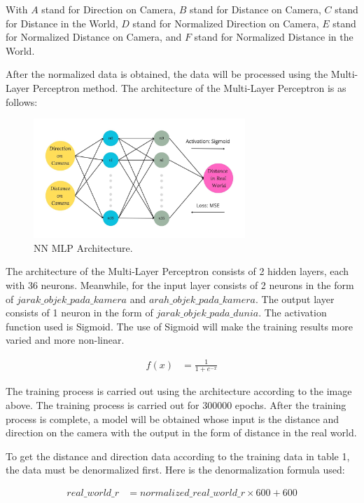 With $A$ stand for Direction on Camera, $B$ stand for Distance on Camera, $C$ stand for Distance in the World, $D$ stand for Normalized Direction on Camera, $E$ stand for Normalized Distance on Camera, and $F$ stand for Normalized Distance in the World.

After the normalized data is obtained, the data will be processed using the Multi-Layer Perceptron method. The architecture of the Multi-Layer Perceptron is as follows:

\begin{figure}[H]
  \centering
  \includegraphics[width=8cm]{gambar/anu.jpg}
  \caption{NN MLP Architecture.}
  \label{fig:diag322}
\end{figure}

The architecture of the Multi-Layer Perceptron consists of 2 hidden layers, each with 36 neurons. Meanwhile, for the input layer consists of 2 neurons in the form of $jarak\_objek\_pada\_kamera$ and $arah\_objek\_pada\_kamera$. The output layer consists of 1 neuron in the form of $jarak\_objek\_pada\_dunia$. The activation function used is Sigmoid. The use of Sigmoid will make the training results more varied and more non-linear.

\begin{equation}
  \begin{aligned}
    f(x) &= \frac{1}{1 + e^{-x}}
  \end{aligned}
\end{equation}

The training process is carried out using the architecture according to the image above. The training process is carried out for 300000 epochs. After the training process is complete, a model will be obtained whose input is the distance and direction on the camera with the output in the form of distance in the real world.

To get the distance and direction data according to the training data in table 1, the data must be denormalized first. Here is the denormalization formula used:

\begin{equation}
  \begin{aligned}
    real\_world\_r &= normalized\_real\_world\_r \times 600 + 600 \\
  \end{aligned}
\end{equation} 

